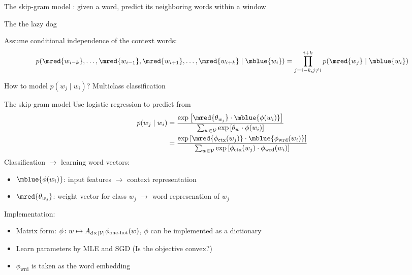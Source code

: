 \documentclass[usenames,dvipsnames,notes,11pt,aspectratio=169]{beamer}
\begin{document}
\begin{frame}
    {The skip-gram model}
    : given a word, predict its neighboring words within a window
    \begin{center}
        The      the lazy dog
    \end{center}

    Assume conditional independence of the context words:
    $$
    p(\mred{w_{i-k}}, \ldots, \mred{w_{i-1}}, \mred{w_{i+1}}, \ldots, \mred{w_{i+k}} \mid \mblue{w_i}) =
    \prod_{j=i-k,j\neq i}^{i+k}p(\mred{w_j}\mid \mblue{w_i})
    $$

    How to model $p(w_j\mid w_i)$? \pause Multiclass classification
\end{frame}

\begin{frame}
    {The skip-gram model}
    Use logistic regression to predict  from 
    \begin{align*}
        p(w_j\mid w_i) &= \frac{\exp\pb{\mred{\theta_{w_j}}\cdot \mblue{\phi(w_i)}}}
    {\sum_{w\in\sV} \exp\pb{\theta_{w}\cdot\phi(w_i)}} \\
        &= \frac{\exp\pb{\mred{\phi_{\text{ctx}}(w_j)}\cdot \mblue{\phi_{\text{wrd}}(w_i)}}}
        {\sum_{w\in\sV} \exp\pb{\phi_{\text{ctx}}(w_j)\cdot\phi_{\text{wrd}}(w_i)}}
    \end{align*}
    Classification $\rightarrow$ learning word vectors:\vspace{-1em}
    \begin{itemize}
        \item $\mblue{\phi(w_i)}$: input features $\rightarrow$ context representation
        \item $\mred{\theta_{w_j}}$: weight vector for class $w_j$
            $\rightarrow$ word represenation of $w_j$
    \end{itemize}

    Implementation:\vspace{-1em}
    \begin{itemize}
        \item Matrix form: $\phi\colon w \mapsto A_{d\times|\mathcal{V}|}\phi_{\text{one-hot}}(w)$,
        $\phi$ can be implemented as a dictionary
        \item Learn parameters by MLE and SGD (Is the objective convex?)
        \item $\phi_{\text{wrd}}$ is taken as the word embedding
    \end{itemize}
\end{frame}
\end{document}
